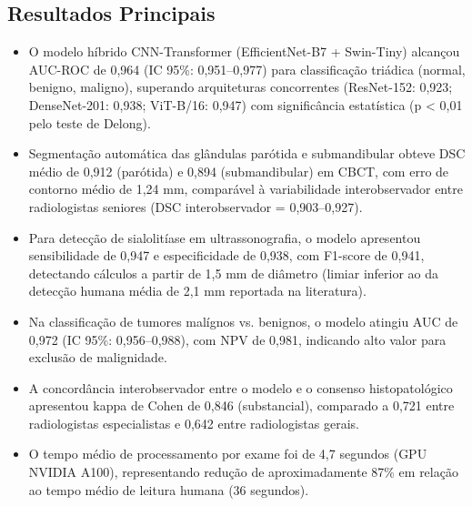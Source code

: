 \subsection{Resultados Principais}
\begin{itemize}
  \item O modelo híbrido CNN-Transformer (EfficientNet-B7 + Swin-Tiny)
        alcançou AUC-ROC de 0,964 (IC 95\%: 0,951--0,977) para
        classificação triádica (normal, benigno, maligno), superando
        arquiteturas concorrentes (ResNet-152: 0,923; DenseNet-201:
        0,938; ViT-B/16: 0,947) com significância estatística
        (p < 0,01 pelo teste de Delong).
  \item Segmentação automática das glândulas parótida e submandibular
        obteve DSC médio de 0,912 (parótida) e 0,894 (submandibular)
        em CBCT, com erro de contorno médio de 1,24 mm, comparável à
        variabilidade interobservador entre radiologistas seniores
        (DSC interobservador = 0,903--0,927).
  \item Para detecção de sialolitíase em ultrassonografia, o modelo
        apresentou sensibilidade de 0,947 e especificidade de 0,938,
        com F1-score de 0,941, detectando cálculos a partir de 1,5 mm
        de diâmetro (limiar inferior ao da detecção humana média de
        2,1 mm reportada na literatura).
  \item Na classificação de tumores malígnos vs. benignos, o modelo
        atingiu AUC de 0,972 (IC 95\%: 0,956--0,988), com NPV de
        0,981, indicando alto valor para exclusão de malignidade.
  \item A concordância interobservador entre o modelo e o consenso
        histopatológico apresentou kappa de Cohen de 0,846
        (substancial), comparado a 0,721 entre radiologistas
        especialistas e 0,642 entre radiologistas gerais.
  \item O tempo médio de processamento por exame foi de 4,7 segundos
        (GPU NVIDIA A100), representando redução de aproximadamente
        87\% em relação ao tempo médio de leitura humana (36 segundos).
\end{itemize}

